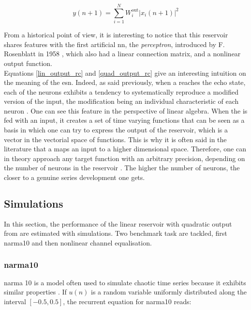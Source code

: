 \begin{equation}
	y(n+1) = \sum_{i=1}^{N} W^{\text{out}}_i |x_i (n+1)|^2
	\label{quad_output_rc}
\end{equation}

From a historical point of view, it is interesting to notice that this reservoir shares features with the first artificial \gls{nn}, the \emph{perceptron}, introduced by F. Rosenblatt in 1958 \cite{Rosenblatt58theperceptron}, which also had a linear connection matrix, and a nonlinear output function.\\

 Equations \eqref{lin_output_rc} and \eqref{quad_output_rc} give an interesting intuition on the meaning of the \gls{esn}. Indeed, as said previously, when a \rc reaches the echo state, each of the neurons exhibits a tendency to systematically reproduce a modified version of the input, the modification being an individual characteristic of each neuron \cite{Jaeger2004}. One can see this feature in the perspective of linear algebra. When the \rcer is fed with an input, it creates a set of time varying functions that can be seen as a basis in which one can try to express the output of the reservoir, which is a vector in the vectorial space of functions. This is why it is often said in the literature that a \rcer maps an input to a higher dimensional space. Therefore, one can in theory approach any target function with an arbitrary precision, depending on the number of neurons in the reservoir \cite{Jaeger2004}. The higher the number of neurons, the closer to a genuine series development one gets.\\


\subsection{Simulations}

In this section, the performance of the linear reservoir with quadratic output from \cite{Vinckier2015} are estimated with simulations. Two benchmark task are tackled, first \acrshort{narma}10 and then nonlinear channel equalisation.


\subsubsection{\acrshort{narma}10}

\gls{narma}  10 is a model often used to simulate chaotic time series because it exhibits similar properties \cite{Paquot2012}. If $u(n)$ is a random variable uniformly distributed along the interval $[-0.5, 0.5]$, the recurrent equation for \gls{narma}10 reads:

